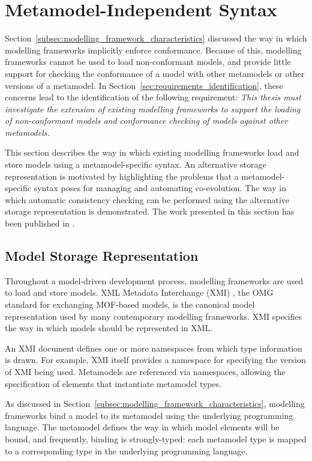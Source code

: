 
\section{Metamodel-Independent Syntax}
\label{sec:mmi_syntax}
Section~\ref{subsec:modelling_framework_characteristics} discussed the way in which modelling frameworks implicitly enforce conformance. Because of this, modelling frameworks cannot be used to load non-conformant models, and provide little support for checking the conformance of a model with other metamodels or other versions of a metamodel. In Section~\ref{sec:requirements_identification}, these concerns lead to the identification of the following requirement: \emph{This thesis must investigate the extension of existing modelling frameworks to support the loading of non-conformant models and conformance checking of models against other metamodels.}

This section describes the way in which existing modelling frameworks load and store models using a metamodel-specific syntax. An alternative storage representation is motivated by highlighting the problems that a metamodel-specific syntax poses for managing and automating co-evolution. The way in which automatic consistency checking can be performed using the alternative storage representation is demonstrated. The work presented in this section has been published in \cite{rose09enhanced}.


\subsection{Model Storage Representation}
Throughout a model-driven development process, modelling frameworks are used to load and store models. XML Metadata Interchange (XMI) \cite{xmi}, the OMG standard for exchanging MOF-based models, is the canonical model representation used by many contemporary modelling frameworks. XMI specifies the way in which models should be represented in XML.

An XMI document defines one or more namespaces from which type information is drawn. For example, XMI itself provides a namespace for specifying the version of XMI being used. Metamodels are referenced via namespaces, allowing the specification of elements that instantiate metamodel types.

As discussed in Section~\ref{subsec:modelling_framework_characteristics}, modelling frameworks bind a model to its metamodel using the underlying programming language. The metamodel defines the way in which model elements will be bound, and frequently, binding is strongly-typed: each metamodel type is mapped to a corresponding type in the underlying programming language.

